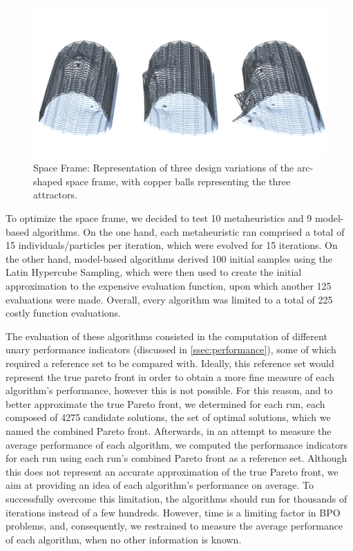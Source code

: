 \begin{figure}[htbp]
	\centering
	\includegraphics[width=1\textwidth]{Images/Evaluation/truss-kat.png}
	\caption[Space Frame: Representation of three space frame design variants]{Space Frame: Representation of three design variations of the arc-shaped space frame, with copper balls representing the three attractors.}
	\label{fig:spaceframe}
\end{figure}

To optimize the space frame, we decided to test 10 metaheuristics and 9 model-based algorithms. On the one hand, each metaheuristic ran comprised a total of 15 individuals/particles per iteration, which were evolved for 15 iterations. On the other hand, model-based algorithms derived 100 initial samples using the Latin Hypercube Sampling, which were then used to create the initial approximation to the expensive evaluation function, upon which another 125 evaluations were made. Overall, every algorithm was limited to a total of 225 costly function evaluations. 

The evaluation of these algorithms consisted in the computation of different unary performance indicators (discussed in \cref{ssec:performance}), some of which required a reference set to be compared with. Ideally, this reference set would represent the true pareto front in order to obtain a more fine measure of each algorithm's performance, however this is not possible. For this reason, and to better approximate the true Pareto front, we determined for each run, each composed of 4275 candidate solutions, the set of optimal solutions, which we named the combined Pareto front. Afterwards, in an attempt to measure the average performance of each algorithm, we computed the performance indicators for each run using each run's combined Pareto front as a reference set. Although this does not represent an accurate approximation of the true Pareto front, we aim at providing an idea of each algorithm's performance on average. To successfully overcome this limitation, the algorithms should run for thousands of iterations instead of a few hundreds. However, time is a limiting factor in \ac{BPO} problems, and, consequently, we restrained to measure the average performance of each algorithm, when no other information is known.

